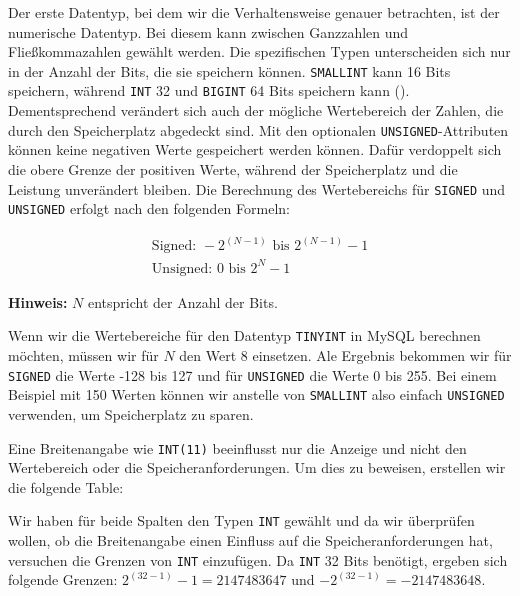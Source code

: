 Der erste Datentyp, bei dem wir die Verhaltensweise genauer betrachten, ist der numerische Datentyp.
Bei diesem kann zwischen Ganzzahlen und Fließkommazahlen gewählt werden.
Die spezifischen Typen unterscheiden sich nur in der Anzahl der Bits, die sie speichern können.
\texttt{SMALLINT} kann 16 Bits speichern, während \texttt{INT} 32 und \texttt{BIGINT} 64 Bits speichern kann (\cite{mysql_data_types_numeric}).
Dementsprechend verändert sich auch der mögliche Wertebereich der Zahlen, die durch den Speicherplatz abgedeckt sind.
Mit den optionalen \texttt{UNSIGNED}-Attributen können keine negativen Werte gespeichert werden können.
Dafür verdoppelt sich die obere Grenze der positiven Werte, während der Speicherplatz und die Leistung unverändert bleiben.
Die Berechnung des Wertebereichs für \texttt{SIGNED} und \texttt{UNSIGNED} erfolgt nach den folgenden Formeln:

\vspace{-30pt}
\begin{gather}
    \text{Signed: } -2^{(N-1)} \text{ bis } 2^{(N-1)} - 1\label{eq:equation-signed} \\
    \text{Unsigned: } 0 \text{ bis } 2^N - 1\label{eq:equation-unsigned}
\end{gather}

\vspace{-10pt}
\textbf{Hinweis:} $N$ entspricht der Anzahl der Bits.

Wenn wir die Wertebereiche für den Datentyp \texttt{TINYINT} in MySQL berechnen möchten, müssen wir für $N$ den Wert 8 einsetzen.
Ale Ergebnis bekommen wir für \texttt{SIGNED} die Werte -128 bis 127 und für \texttt{UNSIGNED} die Werte 0 bis 255.
Bei einem Beispiel mit 150 Werten können wir anstelle von \texttt{SMALLINT} also einfach \texttt{UNSIGNED} verwenden, um Speicherplatz zu sparen.

Eine Breitenangabe wie \texttt{INT(11)} beeinflusst nur die Anzeige und nicht den Wertebereich oder die Speicheranforderungen.
Um dies zu beweisen, erstellen wir die folgende Table:


\vspace{-7pt}

Wir haben für beide Spalten den Typen \texttt{INT} gewählt und da wir überprüfen wollen, ob die Breitenangabe einen Einfluss auf die Speicheranforderungen hat, versuchen die Grenzen von \texttt{INT} einzufügen.
Da \texttt{INT} 32 Bits benötigt, ergeben sich folgende Grenzen: $2^{(32-1)} - 1 = 2147483647$ und $-2^{(32-1)} = -2147483648$.

